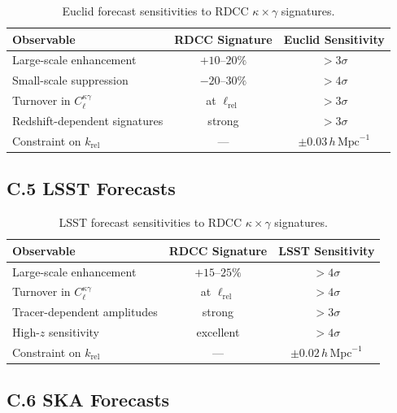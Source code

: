 \documentclass[11pt,a4paper]{article}
\begin{document}
\begin{table}[H]
\centering
\begin{tabular}{lcc}
\hline
\textbf{Observable} & \textbf{RDCC Signature} & \textbf{Euclid Sensitivity} \\
\hline
Large-scale enhancement & $+10$--$20\%$ & $>3\sigma$ \\
Small-scale suppression & $-20$--$30\%$ & $>4\sigma$ \\
Turnover in $C_{\ell}^{\kappa\gamma}$ & at $\ell_{\mathrm{rel}}$ & $>3\sigma$ \\
Redshift-dependent signatures & strong & $>3\sigma$ \\
Constraint on $k_{\mathrm{rel}}$ & --- & $\pm 0.03\,h\,\mathrm{Mpc}^{-1}$ \\
\hline
\end{tabular}
\caption{Euclid forecast sensitivities to RDCC $\kappa \times \gamma$ signatures.}
\end{table}

\subsection*{C.5 LSST Forecasts}

\begin{table}[H]
\centering
\begin{tabular}{lcc}
\hline
\textbf{Observable} & \textbf{RDCC Signature} & \textbf{LSST Sensitivity} \\
\hline
Large-scale enhancement & $+15$--$25\%$ & $>4\sigma$ \\
Turnover in $C_{\ell}^{\kappa\gamma}$ & at $\ell_{\mathrm{rel}}$ & $>4\sigma$ \\
Tracer-dependent amplitudes & strong & $>3\sigma$ \\
High-$z$ sensitivity & excellent & $>4\sigma$ \\
Constraint on $k_{\mathrm{rel}}$ & --- & $\pm 0.02\,h\,\mathrm{Mpc}^{-1}$ \\
\hline
\end{tabular}
\caption{LSST forecast sensitivities to RDCC $\kappa \times \gamma$ signatures.}
\end{table}

\subsection*{C.6 SKA Forecasts}
\end{document}
